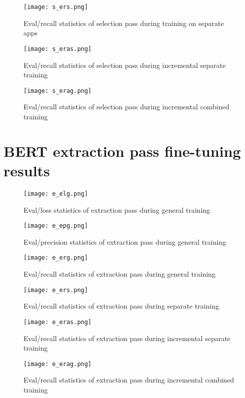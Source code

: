 \documentclass[licencjacka,en]{pracamgr}
\begin{document}
\begin{appendices}
\begin{figure}[h]
    \centering
    \texttt{[image: s\_ers.png]}
    \caption{Eval/recall statistics of selection pass during training on separate apps}
    \label{fig:s_ers}
\end{figure}

\begin{figure}[h]
    \centering
    \texttt{[image: s\_eras.png]}
    \caption{Eval/recall statistics of selection pass during incremental separate training}
    \label{fig:s_eras}
\end{figure}

\begin{figure}[h]
    \centering
    \texttt{[image: s\_erag.png]}
    \caption{Eval/recall statistics of selection pass during incremental combined training}
    \label{fig:s_erag}
\end{figure}

\chapter{BERT extraction pass fine-tuning results} \label{AppD}
\begin{figure}[h]
    \centering
    \texttt{[image: e\_elg.png]}
    \caption{Eval/loss statistics of extraction pass during general training}
    \label{fig:e_elg}
\end{figure}
\begin{figure}[h]
    \centering
    \texttt{[image: e\_epg.png]}
    \caption{Eval/precision statistics of extraction pass during general training}
    \label{fig:e_epg}
\end{figure}
\begin{figure}[h]
    \centering
    \texttt{[image: e\_erg.png]}
    \caption{Eval/recall statistics of extraction pass during general training}
    \label{fig:e_erg}
\end{figure}

\begin{figure}[h]
    \centering
    \texttt{[image: e\_ers.png]}
    \caption{Eval/recall statistics of extraction pass during separate training}
    \label{fig:e_ers}
\end{figure}

\begin{figure}[h]
    \centering
    \texttt{[image: e\_eras.png]}
    \caption{Eval/recall statistics of extraction pass during incremental separate training}
    \label{fig:e_eras}
\end{figure}

\begin{figure}[h]
    \centering
    \texttt{[image: e\_erag.png]}
    \caption{Eval/recall statistics of extraction pass during incremental combined training}
    \label{fig:e_erag}
\end{figure}


\end{appendices}
\end{document}
